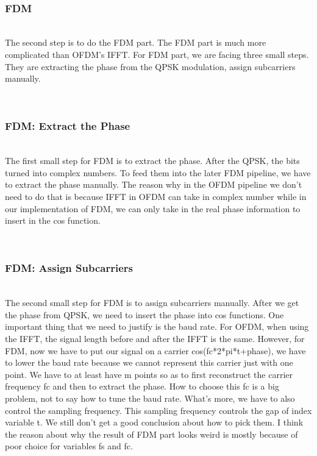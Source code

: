 \documentclass[twocolumn,conference]{IEEEtran}
\begin{document}
    \hfill\\\subsubsection{FDM}\hfill\\
    \indent The second step is to do the FDM part. The FDM part is much more complicated than OFDM’s IFFT. For FDM part, we are facing three small steps. They are extracting the phase from the QPSK modulation, assign subcarriers manually.


    \hfill\\\subsubsection{FDM: Extract the Phase}\hfill\\
    \indent The first small step for FDM is to extract the phase. After the QPSK, the bits turned into complex numbers. To feed them into the later FDM pipeline, we have to extract the phase manually. The reason why in the OFDM pipeline we don’t need to do that is because IFFT in OFDM can take in complex number while in our implementation of FDM, we can only take in the real phase information to insert in the cos function.

    \hfill\\\subsubsection{FDM: Assign Subcarriers}\hfill\\
    \indent The second small step for FDM is to assign subcarriers manually. After we get the phase from QPSK, we need to insert the phase into cos functions. One important thing that we need to justify is the baud rate. For OFDM, when using the IFFT, the signal length before and after the IFFT is the same. However, for FDM, now we have to put our signal on a carrier cos(fc*2*pi*t+phase), we have to lower the baud rate because we cannot represent this carrier just with one point. We have to at least have m points so as to first reconstruct the carrier frequency fc and then to extract the phase. How to choose this fc is a big problem, not to say how to tune the baud rate. What’s more, we have to also control the sampling frequency. This sampling frequency controls the gap of index variable t. We still don’t get a good conclusion about how to pick them. I think the reason about why the result of FDM part looks weird is mostly because of poor choice for variables fs and fc.
\end{document}
